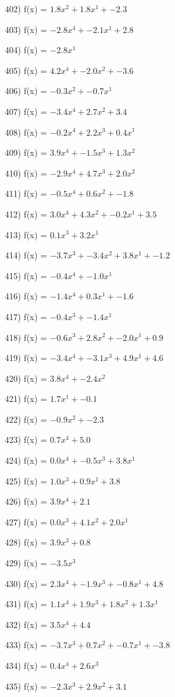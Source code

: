 \documentclass[10pt,a4paper]{article}
\begin{document}
402) f(x) = $1.8x^2 + 1.8x^1 + -2.3$

403) f(x) = $-2.8x^4 + -2.1x^1 + 2.8$

404) f(x) = $-2.8x^1$

405) f(x) = $4.2x^4 + -2.0x^2 + -3.6$

406) f(x) = $-0.3x^2 + -0.7x^1$

407) f(x) = $-3.4x^4 + 2.7x^2 + 3.4$

408) f(x) = $-0.2x^4 + 2.2x^3 + 0.4x^1$

409) f(x) = $3.9x^4 + -1.5x^3 + 1.3x^2$

410) f(x) = $-2.9x^4 + 4.7x^3 + 2.0x^2$

411) f(x) = $-0.5x^4 + 0.6x^2 + -1.8$

412) f(x) = $3.0x^4 + 4.3x^2 + -0.2x^1 + 3.5$

413) f(x) = $0.1x^3 + 3.2x^1$

414) f(x) = $-3.7x^3 + -3.4x^2 + 3.8x^1 + -1.2$

415) f(x) = $-0.4x^4 + -1.0x^1$

416) f(x) = $-1.4x^4 + 0.3x^1 + -1.6$

417) f(x) = $-0.4x^3 + -1.4x^1$

418) f(x) = $-0.6x^3 + 2.8x^2 + -2.0x^1 + 0.9$

419) f(x) = $-3.4x^4 + -3.1x^3 + 4.9x^1 + 4.6$

420) f(x) = $3.8x^4 + -2.4x^2$

421) f(x) = $1.7x^1 + -0.1$

422) f(x) = $-0.9x^2 + -2.3$

423) f(x) = $0.7x^4 + 5.0$

424) f(x) = $0.0x^4 + -0.5x^3 + 3.8x^1$

425) f(x) = $1.0x^3 + 0.9x^1 + 3.8$

426) f(x) = $3.9x^4 + 2.1$

427) f(x) = $0.0x^3 + 4.1x^2 + 2.0x^1$

428) f(x) = $3.9x^3 + 0.8$

429) f(x) = $-3.5x^3$

430) f(x) = $2.3x^4 + -1.9x^3 + -0.8x^1 + 4.8$

431) f(x) = $1.1x^4 + 1.9x^3 + 1.8x^2 + 1.3x^1$

432) f(x) = $3.5x^4 + 4.4$

433) f(x) = $-3.7x^3 + 0.7x^2 + -0.7x^1 + -3.8$

434) f(x) = $0.4x^4 + 2.6x^3$

435) f(x) = $-2.3x^3 + 2.9x^2 + 3.1$
\end{document}
